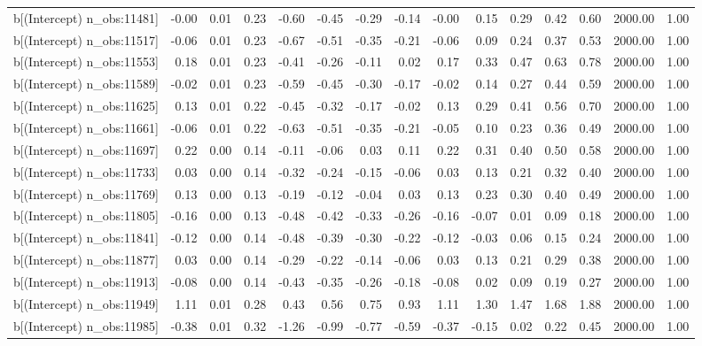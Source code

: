 \begin{table}[ht]
\begin{tabular}{rrrrrrrrrrrrrrr}
  b[(Intercept) n\_obs:11481] & -0.00 & 0.01 & 0.23 & -0.60 & -0.45 & -0.29 & -0.14 & -0.00 & 0.15 & 0.29 & 0.42 & 0.60 & 2000.00 & 1.00 \\ 
  b[(Intercept) n\_obs:11517] & -0.06 & 0.01 & 0.23 & -0.67 & -0.51 & -0.35 & -0.21 & -0.06 & 0.09 & 0.24 & 0.37 & 0.53 & 2000.00 & 1.00 \\ 
  b[(Intercept) n\_obs:11553] & 0.18 & 0.01 & 0.23 & -0.41 & -0.26 & -0.11 & 0.02 & 0.17 & 0.33 & 0.47 & 0.63 & 0.78 & 2000.00 & 1.00 \\ 
  b[(Intercept) n\_obs:11589] & -0.02 & 0.01 & 0.23 & -0.59 & -0.45 & -0.30 & -0.17 & -0.02 & 0.14 & 0.27 & 0.44 & 0.59 & 2000.00 & 1.00 \\ 
  b[(Intercept) n\_obs:11625] & 0.13 & 0.01 & 0.22 & -0.45 & -0.32 & -0.17 & -0.02 & 0.13 & 0.29 & 0.41 & 0.56 & 0.70 & 2000.00 & 1.00 \\ 
  b[(Intercept) n\_obs:11661] & -0.06 & 0.01 & 0.22 & -0.63 & -0.51 & -0.35 & -0.21 & -0.05 & 0.10 & 0.23 & 0.36 & 0.49 & 2000.00 & 1.00 \\ 
  b[(Intercept) n\_obs:11697] & 0.22 & 0.00 & 0.14 & -0.11 & -0.06 & 0.03 & 0.11 & 0.22 & 0.31 & 0.40 & 0.50 & 0.58 & 2000.00 & 1.00 \\ 
  b[(Intercept) n\_obs:11733] & 0.03 & 0.00 & 0.14 & -0.32 & -0.24 & -0.15 & -0.06 & 0.03 & 0.13 & 0.21 & 0.32 & 0.40 & 2000.00 & 1.00 \\ 
  b[(Intercept) n\_obs:11769] & 0.13 & 0.00 & 0.13 & -0.19 & -0.12 & -0.04 & 0.03 & 0.13 & 0.23 & 0.30 & 0.40 & 0.49 & 2000.00 & 1.00 \\ 
  b[(Intercept) n\_obs:11805] & -0.16 & 0.00 & 0.13 & -0.48 & -0.42 & -0.33 & -0.26 & -0.16 & -0.07 & 0.01 & 0.09 & 0.18 & 2000.00 & 1.00 \\ 
  b[(Intercept) n\_obs:11841] & -0.12 & 0.00 & 0.14 & -0.48 & -0.39 & -0.30 & -0.22 & -0.12 & -0.03 & 0.06 & 0.15 & 0.24 & 2000.00 & 1.00 \\ 
  b[(Intercept) n\_obs:11877] & 0.03 & 0.00 & 0.14 & -0.29 & -0.22 & -0.14 & -0.06 & 0.03 & 0.13 & 0.21 & 0.29 & 0.38 & 2000.00 & 1.00 \\ 
  b[(Intercept) n\_obs:11913] & -0.08 & 0.00 & 0.14 & -0.43 & -0.35 & -0.26 & -0.18 & -0.08 & 0.02 & 0.09 & 0.19 & 0.27 & 2000.00 & 1.00 \\ 
  b[(Intercept) n\_obs:11949] & 1.11 & 0.01 & 0.28 & 0.43 & 0.56 & 0.75 & 0.93 & 1.11 & 1.30 & 1.47 & 1.68 & 1.88 & 2000.00 & 1.00 \\ 
  b[(Intercept) n\_obs:11985] & -0.38 & 0.01 & 0.32 & -1.26 & -0.99 & -0.77 & -0.59 & -0.37 & -0.15 & 0.02 & 0.22 & 0.45 & 2000.00 & 1.00 \\ 

\end{tabular}
\end{table}
